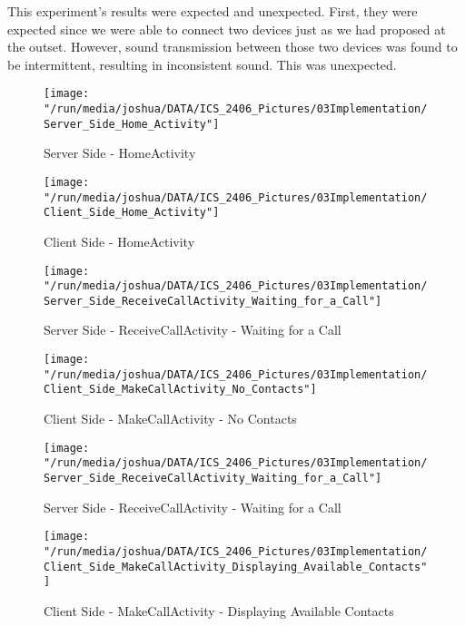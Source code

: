 \documentclass[12pt,svgnames,smaller]{article} %
\begin{document}
		This experiment's results were expected and unexpected. First, they were expected since we were able to connect two devices just as we had proposed at the outset. However, sound transmission between those two devices was found to be intermittent, resulting in inconsistent sound. This was unexpected.
	
		\clearpage
		
		\begin{figure}
			\centering
			\begin{minipage}{.5\textwidth}
				\centering
				\texttt{[image: "/run/media/joshua/DATA/ICS\_2406\_Pictures/03Implementation/Server\_Side\_Home\_Activity"]}
				\caption{Server Side - HomeActivity}
				\label{fig:Implementation-Figure1}			
			\end{minipage}%
			\begin{minipage}{0.5\textwidth}
					\centering
					\texttt{[image: "/run/media/joshua/DATA/ICS\_2406\_Pictures/03Implementation/Client\_Side\_Home\_Activity"]}
					\caption{Client Side - HomeActivity}
					\label{fig:Implementation-Figure2}
			\end{minipage}
		\end{figure} 
	
		\begin{figure}
			\centering
			\begin{minipage}{.5\textwidth}
				\centering
				\texttt{[image: "/run/media/joshua/DATA/ICS\_2406\_Pictures/03Implementation/Server\_Side\_ReceiveCallActivity\_Waiting\_for\_a\_Call"]}
				\caption{Server Side - ReceiveCallActivity - Waiting for a Call}
				\label{fig:Implementation-Figure3}			
			\end{minipage}%
			\begin{minipage}{0.5\textwidth}
				\centering
				\texttt{[image: "/run/media/joshua/DATA/ICS\_2406\_Pictures/03Implementation/Client\_Side\_MakeCallActivity\_No\_Contacts"]}
				\caption{Client Side - MakeCallActivity - No Contacts}
				\label{fig:Implementation-Figure4}
			\end{minipage}
		\end{figure} 
	
		\begin{figure}
			\centering
			\begin{minipage}{.5\textwidth}
				\centering
				\texttt{[image: "/run/media/joshua/DATA/ICS\_2406\_Pictures/03Implementation/Server\_Side\_ReceiveCallActivity\_Waiting\_for\_a\_Call"]}
				\caption{Server Side - ReceiveCallActivity - Waiting for a Call}
				\label{fig:Implementation-Figure5}			
			\end{minipage}%
			\begin{minipage}{0.5\textwidth}
				\centering
				\texttt{[image: "/run/media/joshua/DATA/ICS\_2406\_Pictures/03Implementation/Client\_Side\_MakeCallActivity\_Displaying\_Available\_Contacts"]}
				\caption{Client Side - MakeCallActivity - Displaying Available Contacts}
				\label{fig:Implementation-Figure6}
			\end{minipage}
		\end{figure} 
\end{document}
